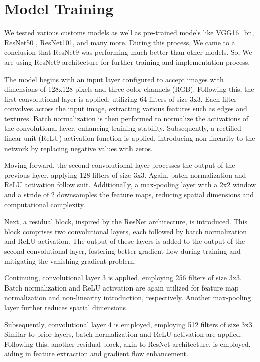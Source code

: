 	\section{Model Training}
		We tested various customs models as well as pre-trained models like VGG16\_bn\cite{simonyan2015deep}, ResNet50 \cite{DBLP:journals/corr/HeZRS15}, ResNet101\cite{DBLP:journals/corr/HeZRS15}, and many more. During this process, We came to a conclusion that ResNet9 was performing much better than other models. So, We are using ResNet9 architecture for further training and implementation process.
		
		The model begins with an input layer configured to accept images with dimensions of 128x128 pixels and three color channels (RGB). Following this, the first convolutional layer is applied, utilizing 64 filters of size 3x3. Each filter convolves across the input image, extracting various features such as edges and textures. Batch normalization is then performed to normalize the activations of the convolutional layer, enhancing training stability. Subsequently, a rectified linear unit (ReLU) activation function is applied, introducing non-linearity to the network by replacing negative values with zeros.

		Moving forward, the second convolutional layer processes the output of the previous layer, applying 128 filters of size 3x3. Again, batch normalization and ReLU activation follow suit. Additionally, a max-pooling layer with a 2x2 window and a stride of 2 downsamples the feature maps, reducing spatial dimensions and computational complexity.

		Next, a residual block, inspired by the ResNet architecture, is introduced. This block comprises two convolutional layers, each followed by batch normalization and ReLU activation. The output of these layers is added to the output of the second convolutional layer, fostering better gradient flow during training and mitigating the vanishing gradient problem.

		Continuing, convolutional layer 3 is applied, employing 256 filters of size 3x3. Batch normalization and ReLU activation are again utilized for feature map normalization and non-linearity introduction, respectively. Another max-pooling layer further reduces spatial dimensions.

		Subsequently, convolutional layer 4 is employed, employing 512 filters of size 3x3. Similar to prior layers, batch normalization and ReLU activation are applied. Following this, another residual block, akin to ResNet architecture, is employed, aiding in feature extraction and gradient flow enhancement.

